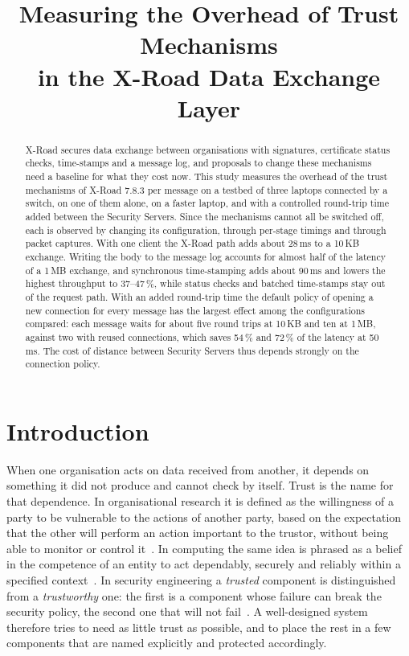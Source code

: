 \documentclass[conference,a4paper]{IEEEtran}
\title{Measuring the Overhead of Trust Mechanisms\\in the X-Road Data Exchange Layer}
\author{\IEEEauthorblockN{Ruslan Nechshadimov}
\IEEEauthorblockA{University of Tartu\\Supervisor: Artjom Lind}}
\begin{document}
\maketitle
\thispagestyle{plain}
\pagestyle{plain}

\begin{abstract}
X-Road secures data exchange between organisations with signatures, certificate status checks,
time-stamps and a message log, and proposals to change these mechanisms need a baseline for what they
cost now. This study measures the overhead of the trust mechanisms of X-Road 7.8.3 per message on a
testbed of three laptops connected by a switch, on one of them alone, on a faster laptop, and with a
controlled round-trip time added between the Security Servers. Since the mechanisms cannot all be
switched off, each is observed by changing its configuration, through per-stage timings and through
packet captures. With one client the X-Road path adds about 28\,ms to a 10\,KB exchange. Writing the
body to the message log accounts for almost half of the latency of a 1\,MB exchange, and synchronous
time-stamping adds about 90\,ms and lowers the highest throughput to 37--47\,\%, while status checks and batched time-stamps stay
out of the request path. With an added round-trip time the default policy of opening a new connection
for every message has the largest effect among the configurations compared: each message waits for about five round trips at 10\,KB and
ten at 1\,MB, against two with reused connections, which saves 54\,\% and 72\,\% of the latency at
50\,ms. The cost of distance between Security Servers thus depends strongly on the connection policy.
\end{abstract}

\section{Introduction}

When one organisation acts on data received from another, it depends on something it did not
produce and cannot check by itself. Trust is the name for that dependence. In organisational
research it is defined as the willingness of a party to be vulnerable to the
actions of another party, based on the expectation that the other will perform an action important
to the trustor, without being able to monitor or control it~\cite{mayer1995}. In computing the same
idea is phrased as a belief in the competence of an entity to act dependably, securely and reliably
within a specified context~\cite{grandison2000}. In security engineering a \emph{trusted} component
is distinguished from a \emph{trustworthy} one: the first is a component whose failure can break the
security policy, the second one that will not fail~\cite{anderson2020}. A well-designed system therefore
tries to need as little trust as possible, and to place the rest in a few components that are named
explicitly and protected accordingly.
\end{document}
